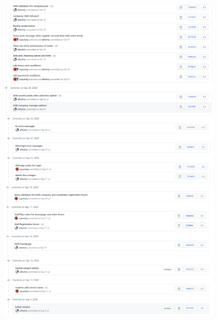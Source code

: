 \documentclass[a4paper,12pt]{report}
\begin{document}
\begin{figure}[bph]
	\centering
	\includegraphics[width=.8\linewidth]{img/screenshots/git/10}
	\includegraphics[width=.8\linewidth]{img/screenshots/git/11}
	\includegraphics[width=.8\linewidth]{img/screenshots/git/12}
	\includegraphics[width=.8\linewidth]{img/screenshots/git/13}
\end{figure}

\pagebreak
\end{document}
